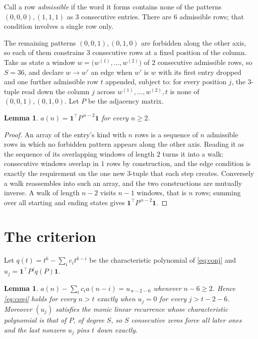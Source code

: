 \documentclass[11pt,a4paper]{article}
\theoremstyle{plain}
\newtheorem{lemma}[theorem]{Lemma}
\theoremstyle{definition}
\begin{document}
Call a row \emph{admissible} if the word it forms contains none of the patterns
$(0,0,0), (1,1,1)$ as $3$ consecutive entries. There are $6$ admissible rows; that condition
involves a single row only.

The remaining patterns $(0,0,1), (0,1,0)$ are forbidden along the other axis, so each of them
constrains $3$ consecutive rows at a fixed position of the column. Take as state a
window $w=\bigl(w^{(1)},\dots,w^{(2)}\bigr)$ of $2$ consecutive admissible
rows, so $S=36$, and declare $w\to w'$ an edge when $w'$ is $w$ with its first entry
dropped and one further admissible row $t$ appended, subject to: for every position
$j$, the $3$-tuple read down the column $j$ across $w^{(1)},\dots,w^{(2)},t$
is none of $(0,0,1), (0,1,0)$. Let $P$ be the adjacency matrix.

\begin{lemma}\label{lem:walk}
$a(n)=\mathbf{1}^{\!\top}P^{\,n-2}\mathbf{1}$ for every $n\ge2$.
\end{lemma}

\begin{proof}
An array of the entry's kind with $n$ rows is a sequence of $n$ admissible rows in
which no forbidden pattern appears along the other axis. Reading it as the sequence of its
overlapping windows of length $2$ turns it into a walk: consecutive windows overlap in
$1$ rows by construction, and the edge condition is exactly the requirement on the one
new $3$-tuple that each step creates. Conversely a walk reassembles into such an array,
and the two constructions are mutually inverse. A walk of length $n-2$ visits $n-1$
windows, that is $n$ rows; summing over all starting and ending states gives
$\mathbf{1}^{\!\top}P^{\,n-2}\mathbf{1}$.
\end{proof}

\section{The criterion}

Let $q(t)=t^{6}-\sum_i c_i t^{6-i}$ be the characteristic polynomial of
\eqref{eq:conj} and $u_j=\mathbf{1}^{\!\top}P^{j}q(P)\mathbf{1}$.

\begin{lemma}\label{lem:crit}
$a(n)-\sum_i c_i a(n-i)=u_{\,n-2-6}$ whenever $n-6\ge2$. Hence
\eqref{eq:conj} holds for every $n>t$ exactly when $u_j=0$ for every
$j>t-2-6$. Moreover $(u_j)$ satisfies the monic linear recurrence whose
characteristic polynomial is that of $P$, of degree $S$, so $S$ consecutive zeros force all
later ones and the last nonzero $u_j$ pins $t$ down exactly.
\end{lemma}
\end{document}
